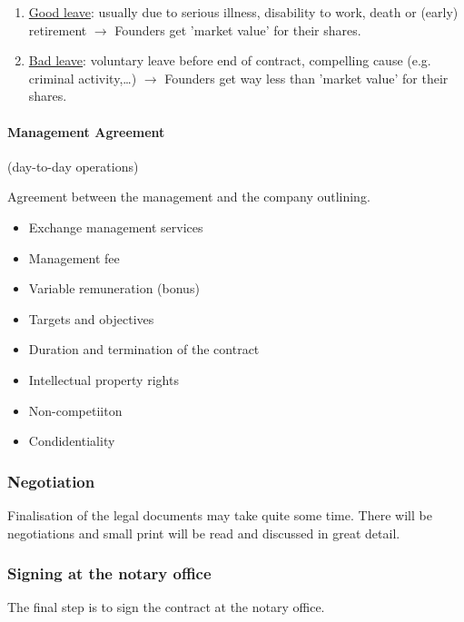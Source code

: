 \begin{enumerate}[]
    \item \underline{Good leave}: usually due to serious illness, disability to
        work, death or (early) retirement $\rightarrow$ Founders get 'market
        value' for their shares.
    \item \underline{Bad leave}: voluntary leave before end of contract,
        compelling cause (e.g. criminal activity,\dots) $\rightarrow$ Founders
        get way less than 'market value' for their shares.
\end{enumerate}

\paragraph{Management Agreement} (day-to-day operations)

Agreement between the management and the company outlining.
\begin{itemize}
    \item Exchange management services
    \item Management fee
    \item Variable remuneration (bonus)
    \item Targets and objectives
    \item Duration and termination of the contract
    \item Intellectual property rights
    \item Non-competiiton
    \item Condidentiality
\end{itemize}

\subsubsection{Negotiation}

Finalisation of the legal documents may take quite some time. There will be
negotiations and small print will be read and discussed in great detail.

\subsubsection{Signing at the notary office}

The final step is to sign the contract at the notary office.

